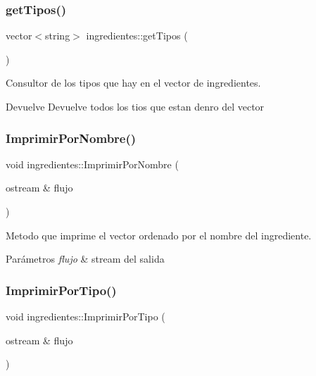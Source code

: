 \subsubsection{\texorpdfstring{get\+Tipos()}{getTipos()}}
{\footnotesize\ttfamily vector$<$string$>$ ingredientes\+::get\+Tipos (\begin{DoxyParamCaption}{ }\end{DoxyParamCaption})}



Consultor de los tipos que hay en el vector de ingredientes. 

\begin{DoxyReturn}{Devuelve}
Devuelve todos los tios que estan denro del vector 
\end{DoxyReturn}
\mbox{\label{classingredientes_adefafd151edf8a8997bca2dc22057ece}} 
\subsubsection{\texorpdfstring{Imprimir\+Por\+Nombre()}{ImprimirPorNombre()}}
{\footnotesize\ttfamily void ingredientes\+::\+Imprimir\+Por\+Nombre (\begin{DoxyParamCaption}\item[{ostream \&}]{flujo }\end{DoxyParamCaption})}



Metodo que imprime el vector ordenado por el nombre del ingrediente. 


\begin{DoxyParams}{Parámetros}
{\em flujo} & stream del salida \\
\hline
\end{DoxyParams}
\mbox{\label{classingredientes_a683d032576cbc230c210aa51cdbcc93e}} 
\subsubsection{\texorpdfstring{Imprimir\+Por\+Tipo()}{ImprimirPorTipo()}}
{\footnotesize\ttfamily void ingredientes\+::\+Imprimir\+Por\+Tipo (\begin{DoxyParamCaption}\item[{ostream \&}]{flujo }\end{DoxyParamCaption})}



